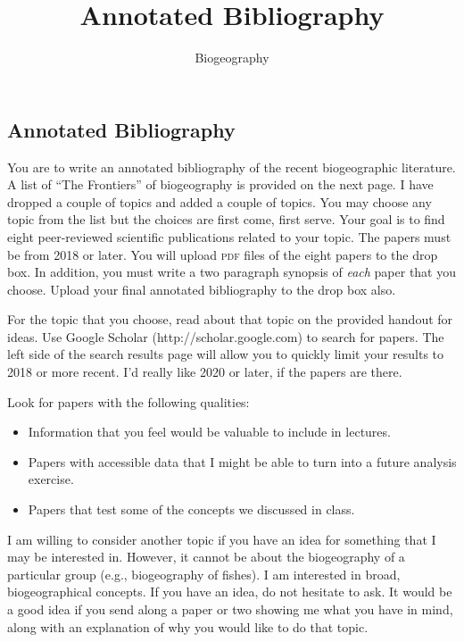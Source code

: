 \documentclass[12pt]{article}
\title{Annotated Bibliography}
\author{Biogeography}
\date{}                                           %
\begin{document}
\thispagestyle{plain}



\subsection*{Annotated Bibliography}

You are to write an annotated bibliography of the recent biogeographic literature.  A list of ``The Frontiers'' of biogeography is provided on the next page.  I have dropped a couple of topics and added a couple of topics. You may choose any topic from the list but the choices are first come, first serve. Your goal is to find eight peer-reviewed scientific publications related to your topic.  The papers must be from 2018 or later.  You will upload \textsc{pdf} files of the eight papers to the drop box. In addition, you must write a two paragraph synopsis of \textit{each} paper that you choose. Upload your final annotated bibliography to the drop box also.

For the topic that you choose, read about that topic on the provided handout for ideas. Use Google Scholar (http://scholar.google.com) to search for papers. The left side of the search results page will allow you to quickly limit your results to 2018 or more recent.  I'd really like 2020 or later, if the papers are there.

Look for papers with the following qualities:

\begin{itemize}

\item Information that you feel would be valuable to include in lectures.

\item Papers with accessible data that I might be able to turn into a future analysis exercise.

\item Papers that test some of the concepts we discussed in class.

\end{itemize}

I am willing to consider another topic if you have an idea for something that I may be interested in. However, it cannot be about the biogeography of a particular group (e.g., biogeography of fishes). I am interested in broad, biogeographical concepts.  If you have an idea, do not hesitate to ask. It would be a good idea if you send along a paper or two showing me what you have in mind, along with an explanation of why you would like to do that topic.
\end{document}

